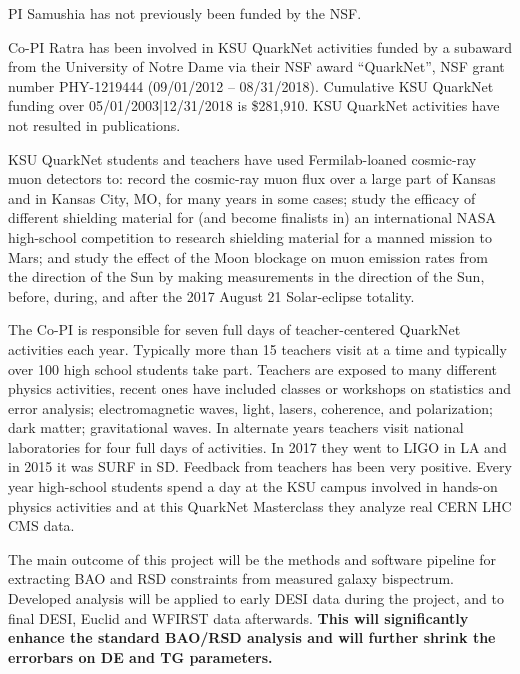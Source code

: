 
PI Samushia has not previously been funded by the NSF.

Co-PI Ratra has been involved in  KSU QuarkNet activities funded by a subaward
from the University of Notre Dame via their NSF award ``QuarkNet'', NSF grant
number PHY-1219444 (09/01/2012 -- 08/31/2018).  Cumulative KSU QuarkNet funding
over 05/01/2003|12/31/2018 is \$281,910. KSU QuarkNet activities have not
resulted in publications. 

KSU QuarkNet students and teachers have used Fermilab-loaned cosmic-ray muon
detectors to: record the cosmic-ray muon flux over a large part of Kansas and
in Kansas City, MO, for many years in some cases; study the efficacy of
different shielding material for (and become finalists in) an international
NASA high-school competition to research shielding material for a manned
mission to Mars; and study the effect of the Moon blockage on muon emission
rates from the direction of the Sun by making measurements in the direction of
the Sun, before, during, and after the 2017 August 21 Solar-eclipse totality.

The Co-PI is responsible for seven full days of teacher-centered QuarkNet
activities each year. Typically more than 15 teachers visit at a time and
typically over 100 high school students take part. Teachers are exposed to many
different physics activities, recent ones have included classes or workshops on
statistics and error analysis; electromagnetic waves, light, lasers, coherence,
and polarization; dark matter; gravitational waves.  In alternate years
teachers visit national laboratories for four full days of activities. In 2017
they went to LIGO in LA and in 2015 it was SURF in SD.  Feedback from teachers
has been very positive. Every year high-school students spend a day at the KSU
campus involved in hands-on physics activities and at this QuarkNet Masterclass
they analyze real CERN LHC CMS data.


The main outcome of this project will be the methods and software pipeline for
extracting BAO and RSD constraints from measured galaxy bispectrum. Developed
analysis will be applied to early DESI data during the project, and to final DESI, Euclid
and WFIRST data afterwards. \textbf{This will significantly enhance the
standard BAO/RSD analysis and will further shrink the errorbars on DE and TG
parameters.}

